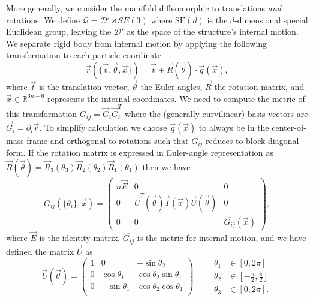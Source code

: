\documentclass[12pt]{report}
\begin{document}
More generally, we consider the manifold diffeomorphic to translations \emph{and} rotations.
We define $\mathcal{Q} = \mathcal{D}' \rtimes SE(3)$ where $\textrm{SE}(d)$ is the $d$-dimensional special Euclidean group, leaving the $\mathcal{D}'$ as the space of the structure's internal motion.
We separate rigid body from internal motion by applying the following transformation to each particle coordinate
\begin{equation}
  \vec{r}(\{\vec{t}, \vec{\theta}, \vec{x}\}) =
  \vec{t} + \vec{R}(\vec{\theta}) \cdot \vec{q}(\vec{x}),
\end{equation}
where $\vec{t}$ is the translation vector, $\vec{\theta}$ the Euler angles, $\vec{R}$ the rotation matrix, and $\vec{x} \in \mathbb{R}^{3n-6}$ represents the internal coordinates.
We need to compute the metric of this transformation $G_{ij} = \vec{G}_i \vec{G}_i^T$ where the (generally curvilinear) basis vectors are $\vec{G}_i = \partial_i \vec{r}$.
To simplify calculation we choose $\vec{q}(\vec{x})$ to always be in the center-of-mass frame and orthogonal to rotations such that $G_{ij}$ reduces to block-diagonal form.
If the rotation matrix is expressed in Euler-angle representation as $\vec{R}(\vec{\theta}) = \vec{R}_3(\theta_3) \vec{R}_2(\theta_2) \vec{R}_1(\theta_1)$ then we have%
\begin{equation}
  G_{ij}(\{\theta_i\}, \vec{x}) =
  \begin{pmatrix}
    n \vec{E} & 0 & 0 \\
    0 & \vec{U}^T(\vec{\theta}) \vec{I}(\vec{x}) \vec{U}(\vec{\theta}) & 0 \\
    0 & 0 & \overline{G_{ij}}(\vec{x})
  \end{pmatrix},
\end{equation}
where $\vec{E}$ is the identity matrix, $\overline{G_{ij}}$ is the metric for internal motion, and we have defined the matrix $\vec{U}$ as
\begin{equation}
  \vec{U}(\vec{\theta}) =
  \begin{pmatrix}
    1 &  0              & -\sin{\theta_2} \\
    0 &  \cos{\theta_1} &  \cos{\theta_2} \sin{\theta_1} \\
    0 & -\sin{\theta_1} &  \cos{\theta_2} \cos{\theta_1} \\
  \end{pmatrix}
  \qquad
  \begin{aligned}
    \theta_1 &\in [0,2\pi] \\
    \theta_2 &\in \left[-\frac{\pi}{2},\frac{\pi}{2}\right] \\
    \theta_3 &\in [0,2\pi].
  \end{aligned}
\end{equation}
\end{document}
